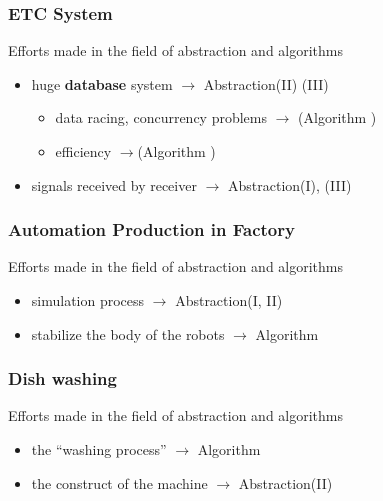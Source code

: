 \documentclass[11pt]{beamer}
\begin{document}
	\begin{frame}
		\frametitle{ETC System}
		
		Efforts made in the field of abstraction and algorithms
		\begin{itemize}
			\item huge \textbf{database} system $\rightarrow$ Abstraction(II) (III)
			\begin{itemize}
				\item data racing, concurrency problems $\rightarrow$ (Algorithm )
				\item efficiency $\rightarrow$(Algorithm )
			\end{itemize}
			\item signals received by receiver $\rightarrow$ Abstraction(I), (III)

		\end{itemize}
	
	\end{frame}

	\begin{frame}
		\frametitle{Automation Production in Factory}
		
		Efforts made in the field of abstraction and algorithms
		\begin{itemize}
			\item simulation process $\rightarrow$ Abstraction(I, II)
			\item stabilize the body of the robots $\rightarrow$ Algorithm 

		\end{itemize}
	
	\end{frame}

	\begin{frame}
		\frametitle{Dish washing}
		
		Efforts made in the field of abstraction and algorithms
		\begin{itemize}
			\item the ``washing process'' $\rightarrow$ Algorithm 
			\item the construct of the machine $\rightarrow$ Abstraction(II)

		\end{itemize}
	
	\end{frame}
\end{document}
